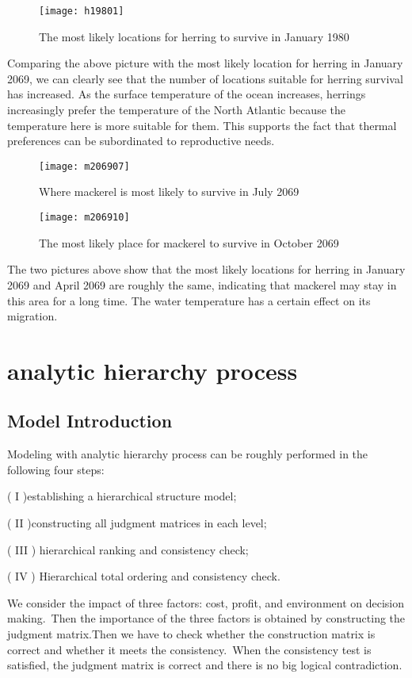 \documentclass{mcmthesis}
\begin{document}
\begin{figure}[h]
	\small
	\centering
	\texttt{[image: h19801]}
	\caption{The most likely locations for herring to survive in January 1980} \label{fig:aa}
\end{figure}

Comparing the above picture with the most likely location for herring in January 2069, we can clearly see that the number of locations suitable for herring survival has increased. As the surface temperature of the ocean increases, herrings increasingly prefer the temperature of the North Atlantic because the temperature here is more suitable for them. This supports the fact that thermal preferences can be subordinated to reproductive needs.

\begin{figure}[h]
	\small
	\centering
	\texttt{[image: m206907]}
	\caption{Where mackerel is most likely to survive in July 2069} \label{fig:aa}
\end{figure}

\begin{figure}[h]
	\small
	\centering
	\texttt{[image: m206910]}
	\caption{The most likely place for mackerel to survive in October 2069} \label{fig:aa}
\end{figure}

The two pictures above show that the most likely locations for herring in January 2069 and April 2069 are roughly the same, indicating that mackerel may stay in this area for a long time. The water temperature has a certain effect on its migration.

\section{analytic hierarchy process}
\subsection{Model Introduction}
Modeling with analytic hierarchy process can be roughly performed in the following four steps:

( I )\quad establishing a hierarchical structure model;

( II )\quad constructing all judgment matrices in each level;

( III ) hierarchical ranking and consistency check;

( IV )  Hierarchical total ordering and consistency check.

We consider the impact of three factors: cost, profit, and environment on decision making. Then the importance of the three factors is obtained by constructing the judgment matrix.Then we have to check whether the construction matrix is correct and whether it meets the consistency. When the consistency test is satisfied, the judgment matrix is correct and there is no big logical contradiction.
\end{document}
